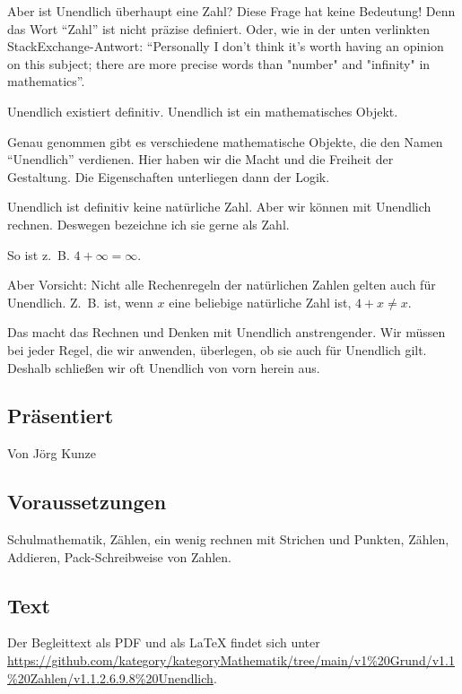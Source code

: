 \documentclass[a4paper]{amsart}
\theoremstyle{definition}
\begin{document}
Aber ist Unendlich überhaupt eine Zahl? Diese Frage hat keine Bedeutung! Denn das Wort "`Zahl"' ist nicht präzise definiert. Oder, wie in der unten verlinkten StackExchange-Antwort: "`Personally I don't think it's worth having an opinion on this subject; there are more precise words than "number" and "infinity" in mathematics"'.

Unendlich existiert definitiv. Unendlich ist ein mathematisches Objekt.

Genau genommen  gibt es verschiedene mathematische Objekte, die den Namen "`Unendlich"' verdienen. Hier haben wir die Macht und die Freiheit der Gestaltung. Die Eigenschaften unterliegen dann der Logik.

Unendlich ist definitiv keine natürliche Zahl. Aber wir können mit Unendlich rechnen. Deswegen bezeichne ich sie gerne als Zahl.

So ist z.~B. $4 + \infty = \infty$.

Aber Vorsicht: Nicht alle Rechenregeln der natürlichen Zahlen gelten auch für Unendlich. Z.~B. ist, wenn $x$ eine beliebige natürliche Zahl ist, $4 +x  \ne x$.

Das macht das Rechnen und Denken mit Unendlich anstrengender. Wir müssen bei jeder Regel, die wir anwenden, überlegen, ob sie auch für Unendlich gilt. Deshalb schließen wir oft Unendlich von vorn herein aus.

\subsection*{Präsentiert}
Von Jörg Kunze

\subsection*{Voraussetzungen}
Schulmathematik, Zählen, ein wenig rechnen mit Strichen und Punkten, Zählen, Addieren, Pack-Schreibweise von Zahlen.

\subsection*{Text}
Der Begleittext als PDF und als LaTeX findet sich unter\\
{\tiny\url{https://github.com/kategory/kategoryMathematik/tree/main/v1%20Grund/v1.1%20Zahlen/v1.1.2.6.9.8%20Unendlich}}.
\end{document}
